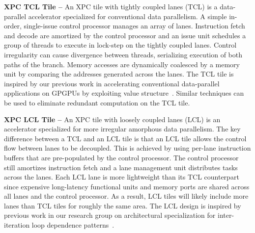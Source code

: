 \textbf{XPC TCL Tile --} An XPC tile with tightly coupled lanes (TCL) is
a data-parallel accelerator specialized for conventional data
parallelism. A simple in-order, single-issue control processor manages an
array of lanes. Instruction fetch and decode are amortized by the control
processor and an issue unit schedules a group of threads to execute in
lock-step on the tightly coupled lanes. Control irregularity can cause
divergence between threads, serializing execution of both paths of the
branch. Memory accesses are dynamically coalesced by a memory unit by
comparing the addresses generated across the lanes.
The TCL tile is inspired by our previous work in accelerating
conventional data-parallel applications on GPGPUs by exploiting value
structure~\cite{kim-simt-vstruct-isca2013}. Similar techniques can be
used to eliminate redundant computation on the TCL tile.


\textbf{XPC LCL Tile --} An XPC tile with loosely coupled lanes (LCL) is
an accelerator specialized for more irregular amorphous data parallelism.
The key difference between a TCL and an LCL tile is that an LCL tile
allows the control flow between lanes to be decoupled. This is achieved
by using per-lane instruction buffers that are pre-populated by the
control processor. The control processor still amortizes instruction
fetch and a lane management unit distributes tasks across the lanes. Each
LCL lane is more lightweight than its TCL counterpart since expensive
long-latency functional units and memory ports are shared across all
lanes and the control processor. As a result, LCL tiles will likely
include more lanes than TCL tiles for roughly the same area. The LCL
design is inspired by previous work in our research group on
architectural specialization for inter-iteration loop dependence
patterns~\cite{srinath-xloops-micro2014}.


